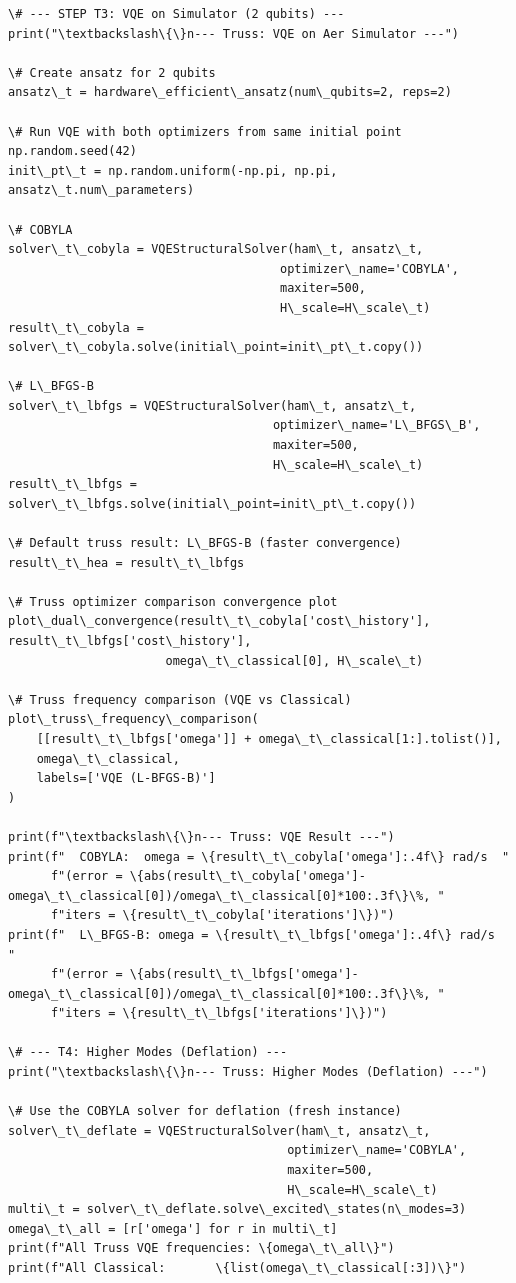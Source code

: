 \documentclass[12pt, a4paper]{article}
\begin{document}
\begin{lstlisting}[style=codestyle, caption={{main.py --- Pipeline Orchestrator}}]
\# --- STEP T3: VQE on Simulator (2 qubits) ---
print("\textbackslash\{\}n--- Truss: VQE on Aer Simulator ---")

\# Create ansatz for 2 qubits
ansatz\_t = hardware\_efficient\_ansatz(num\_qubits=2, reps=2)

\# Run VQE with both optimizers from same initial point
np.random.seed(42)
init\_pt\_t = np.random.uniform(-np.pi, np.pi, ansatz\_t.num\_parameters)

\# COBYLA
solver\_t\_cobyla = VQEStructuralSolver(ham\_t, ansatz\_t,
                                      optimizer\_name='COBYLA',
                                      maxiter=500,
                                      H\_scale=H\_scale\_t)
result\_t\_cobyla = solver\_t\_cobyla.solve(initial\_point=init\_pt\_t.copy())

\# L\_BFGS-B
solver\_t\_lbfgs = VQEStructuralSolver(ham\_t, ansatz\_t,
                                     optimizer\_name='L\_BFGS\_B',
                                     maxiter=500,
                                     H\_scale=H\_scale\_t)
result\_t\_lbfgs = solver\_t\_lbfgs.solve(initial\_point=init\_pt\_t.copy())

\# Default truss result: L\_BFGS-B (faster convergence)
result\_t\_hea = result\_t\_lbfgs

\# Truss optimizer comparison convergence plot
plot\_dual\_convergence(result\_t\_cobyla['cost\_history'], result\_t\_lbfgs['cost\_history'],
                      omega\_t\_classical[0], H\_scale\_t)

\# Truss frequency comparison (VQE vs Classical)
plot\_truss\_frequency\_comparison(
    [[result\_t\_lbfgs['omega']] + omega\_t\_classical[1:].tolist()],
    omega\_t\_classical,
    labels=['VQE (L-BFGS-B)']
)

print(f"\textbackslash\{\}n--- Truss: VQE Result ---")
print(f"  COBYLA:  omega = \{result\_t\_cobyla['omega']:.4f\} rad/s  "
      f"(error = \{abs(result\_t\_cobyla['omega']-omega\_t\_classical[0])/omega\_t\_classical[0]*100:.3f\}\%, "
      f"iters = \{result\_t\_cobyla['iterations']\})")
print(f"  L\_BFGS-B: omega = \{result\_t\_lbfgs['omega']:.4f\} rad/s  "
      f"(error = \{abs(result\_t\_lbfgs['omega']-omega\_t\_classical[0])/omega\_t\_classical[0]*100:.3f\}\%, "
      f"iters = \{result\_t\_lbfgs['iterations']\})")

\# --- T4: Higher Modes (Deflation) ---
print("\textbackslash\{\}n--- Truss: Higher Modes (Deflation) ---")

\# Use the COBYLA solver for deflation (fresh instance)
solver\_t\_deflate = VQEStructuralSolver(ham\_t, ansatz\_t,
                                       optimizer\_name='COBYLA',
                                       maxiter=500,
                                       H\_scale=H\_scale\_t)
multi\_t = solver\_t\_deflate.solve\_excited\_states(n\_modes=3)
omega\_t\_all = [r['omega'] for r in multi\_t]
print(f"All Truss VQE frequencies: \{omega\_t\_all\}")
print(f"All Classical:       \{list(omega\_t\_classical[:3])\}")


\end{lstlisting}
\end{document}
